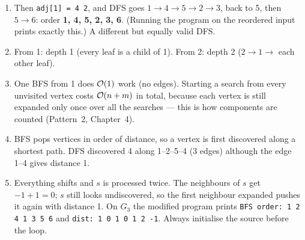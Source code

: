 \begin{solutionbox}[Answers]
\begin{enumerate}[leftmargin=*]
    \item Then \texttt{adj[1] = 4 2}, and DFS goes $1\to4\to5\to2\to3$, back to 5, then $5\to6$: order \textbf{1, 4, 5, 2, 3, 6}. (Running the program on the reordered input prints exactly this.) A different but equally valid DFS.
    \item From 1: depth 1 (every leaf is a child of 1). From 2: depth 2 ($2\to1\to$ each other leaf).
    \item One BFS from 1 does $\mathcal{O}(1)$ work (no edges). Starting a search from every unvisited vertex costs $\mathcal{O}(n+m)$ in total, because each vertex is still expanded only once over all the searches --- this is how components are counted (Pattern~2, Chapter~4).
    \item BFS pops vertices in order of distance, so a vertex is first discovered along a shortest path. DFS discovered 4 along 1--2--5--4 (3 edges) although the edge 1--4 gives distance 1.
    \item Everything shifts and $s$ is processed twice. The neighbours of $s$ get $-1+1=0$; $s$ still looks undiscovered, so the first neighbour expanded pushes it again with distance 1. On $G_3$ the modified program prints \texttt{BFS order: 1 2 4 1 3 5 6} and \texttt{dist: 1 0 1 0 1 2 -1}. Always initialise the source before the loop.
\end{enumerate}
\end{solutionbox}

